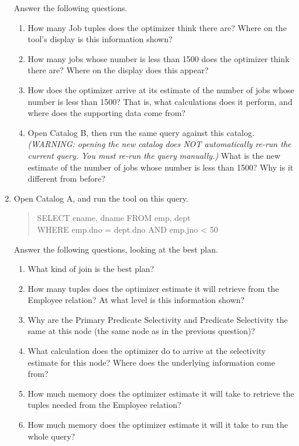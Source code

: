 \begin{enumerate}
Answer the following questions.
\begin{enumerate}
\item
How many Job tuples does the optimizer think there are?  Where on
the tool's display is this information shown?
\item
How many jobs whose number is less than 1500 does the optimizer
think there are?  Where on the display does this appear?
\item
How does the optimizer arrive at its estimate of the number of
jobs whose number is less than 1500?  That is, what calculations
does it perform, and where does the supporting data come from?
\item
Open Catalog B, then run the same query against this catalog.  {\em (WARNING:
opening the new catalog does NOT automatically re-run the current query.
You must re-run the query manually.)}  What is the new estimate of the
number of jobs whose number is less than 1500?  Why is it
different from before?
\end{enumerate}


\item

Open Catalog A, and run the tool on this query. 
\begin{quote}
        SELECT ename, dname FROM emp, dept\\
        WHERE emp.dno = dept.dno AND emp.jno < 50
\end{quote}

Answer the following
questions, looking at the best plan.
\begin{enumerate}
\item
What kind of join is the best plan?
\item
How many tuples does the optimizer estimate it will retrieve from the
Employee relation?  At what level is this information shown?
\item
Why are the Primary Predicate Selectivity and Predicate Selectivity the
same at this node (the same node as in the previous question)?
\item
What calculation does the optimizer do to arrive at the selectivity
estimate for this node?  Where does the underlying information come from?
\item
How much memory does the optimizer estimate it will take to retrieve the
tuples needed from the Employee relation?
\item
How much memory does the optimizer estimate it will it take to run the
whole query?
\end{enumerate}



\end{enumerate}
